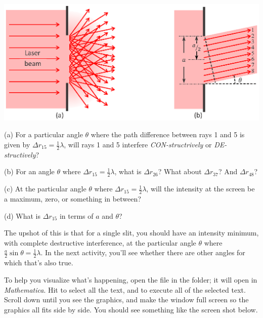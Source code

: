 \answerspace{0.2in}
\begin{center}
\includegraphics{diffraction_of_light/one_slit_rays_color.eps}
\end{center}
\answerspace{0.2in}

(a) For a particular angle $\theta$ where the path difference between rays 1 and 5 is given by $\Delta r_{15}=\frac{1}{2}\lambda$, will rays 1 and 5 interfere \textit{CON-structrively} or \textit{DE-structively}?
\answerspace{0.4in}

(b) For an angle $\theta$ where $\Delta r_{15}=\frac{1}{2}\lambda$, what is $\Delta r_{26}$?  What about $\Delta r_{37}$? And $\Delta r_{48}$?
\answerspace{0.5in}

(c) At the particular angle $\theta$ where $\Delta r_{15}=\frac{1}{2}\lambda$, will the intensity at the screen be a maximum, zero, or something in between?
\answerspace{0.4in}

(d) What is $\Delta r_{15}$ in terms of $a$ and $\theta$?
\answerspace{0.4in}

The upshot of this is that for a single slit, you should have an intensity minimum, with complete destructive interference, at the particular angle $\theta$ where $\frac{a}{2} \sin \theta = \frac{1}{2}\lambda$.  In the next activity, you'll see whether there are other angles for which that's also true.

\pagebreak[3]
To help you visualize what's happening, open the file  in the \filename{\coursefolder} folder; 
it will open in \textit{Mathematica}.  Hit  to select all the text, and  
to execute all of the selected text.  Scroll down until you see the graphics, and make the window full screen so the graphics all fits side by side.  You should see something like the screen shot below.

